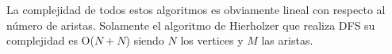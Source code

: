 La complejidad de todos estos algoritmos es obviamente lineal con respecto al número de aristas. Solamente el algoritmo de Hierholzer que realiza DFS su complejidad es O($N+N$) siendo $N$ los vertices y $M$ las aristas.